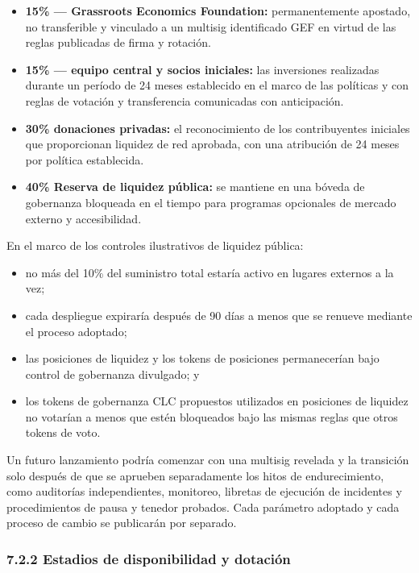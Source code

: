 \documentclass[11pt]{article}
\begin{document}
\begin{itemize}[leftmargin=*]
\item \textbf{15\% --- Grassroots Economics Foundation:} permanentemente apostado, no transferible y vinculado a un multisig identificado GEF en virtud de las reglas publicadas de firma y rotación.
\item \textbf{15\% --- equipo central y socios iniciales:} las inversiones realizadas durante un período de 24 meses establecido en el marco de las políticas y con reglas de votación y transferencia comunicadas con anticipación.
\item \textbf{30\%  donaciones privadas:} el reconocimiento de los contribuyentes iniciales que proporcionan liquidez de red aprobada, con una atribución de 24 meses por política establecida.
\item \textbf{40\%  Reserva de liquidez pública:} se mantiene en una bóveda de gobernanza bloqueada en el tiempo para programas opcionales de mercado externo y accesibilidad.
\end{itemize}
En el marco de los controles ilustrativos de liquidez pública:

\begin{itemize}[leftmargin=*]
\item no más del 10\% del suministro total estaría activo en lugares externos a la vez;
\item cada despliegue expiraría después de 90 días a menos que se renueve mediante el proceso adoptado;
\item las posiciones de liquidez y los tokens de posiciones permanecerían bajo control de gobernanza divulgado; y
\item los tokens de gobernanza CLC propuestos utilizados en posiciones de liquidez no votarían a menos que estén bloqueados bajo las mismas reglas que otros tokens de voto.
\end{itemize}
Un futuro lanzamiento podría comenzar con una multisig revelada y la transición solo después de que se aprueben separadamente los hitos de endurecimiento, como auditorías independientes, monitoreo, libretas de ejecución de incidentes y procedimientos de pausa y tenedor probados. Cada parámetro adoptado y cada proceso de cambio se publicarán por separado.

\subsubsection*{7.2.2 Estadios de disponibilidad y dotación}
\end{document}
